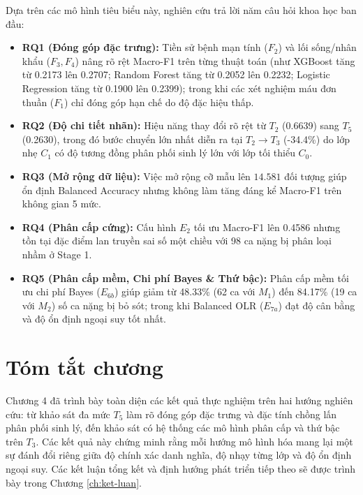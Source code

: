 Dựa trên các mô hình tiêu biểu này, nghiên cứu trả lời năm câu hỏi khoa học ban đầu:
\begin{itemize}
    \item \textbf{RQ1 (Đóng góp đặc trưng):} Tiền sử bệnh mạn tính ($F_2$) và lối sống/nhân khẩu ($F_3, F_4$) nâng rõ rệt Macro-F1 trên từng thuật toán (như XGBoost tăng từ 0.2173 lên 0.2707; Random Forest tăng từ 0.2052 lên 0.2232; Logistic Regression tăng từ 0.1900 lên 0.2399); trong khi các xét nghiệm máu đơn thuần ($F_1$) chỉ đóng góp hạn chế do độ đặc hiệu thấp.
    \item \textbf{RQ2 (Độ chi tiết nhãn):} Hiệu năng thay đổi rõ rệt từ $T_2$ (0.6639) sang $T_5$ (0.2630), trong đó bước chuyển lớn nhất diễn ra tại $T_2 \to T_3$ (-34.4\%) do lớp nhẹ $C_1$ có độ tương đồng phân phối sinh lý lớn với lớp tối thiểu $C_0$.
    \item \textbf{RQ3 (Mở rộng dữ liệu):} Việc mở rộng cỡ mẫu lên $14.581$ đối tượng giúp ổn định Balanced Accuracy nhưng không làm tăng đáng kể Macro-F1 trên không gian 5 mức.
    \item \textbf{RQ4 (Phân cấp cứng):} Cấu hình $E_2$ tối ưu Macro-F1 lên 0.4586 nhưng tồn tại đặc điểm lan truyền sai số một chiều với 98 ca nặng bị phân loại nhầm ở Stage 1.
    \item \textbf{RQ5 (Phân cấp mềm, Chi phí Bayes \& Thứ bậc):} Phân cấp mềm tối ưu chi phí Bayes ($E_{6b}$) giúp giảm từ 48.33\% (62 ca với $M_1$) đến 84.17\% (19 ca với $M_2$) số ca nặng bị bỏ sót; trong khi Balanced OLR ($E_{7a}$) đạt độ cân bằng và độ ổn định ngoại suy tốt nhất.
\end{itemize}

\section{Tóm tắt chương}
\label{sec:tom-tat-chuong-4}

Chương 4 đã trình bày toàn diện các kết quả thực nghiệm trên hai hướng nghiên cứu: từ khảo sát đa mức $T_5$ làm rõ đóng góp đặc trưng và đặc tính chồng lấn phân phối sinh lý, đến khảo sát có hệ thống các mô hình phân cấp và thứ bậc trên $T_3$. Các kết quả này chứng minh rằng mỗi hướng mô hình hóa mang lại một sự đánh đổi riêng giữa độ chính xác danh nghĩa, độ nhạy từng lớp và độ ổn định ngoại suy. Các kết luận tổng kết và định hướng phát triển tiếp theo sẽ được trình bày trong Chương \ref{ch:ket-luan}.
